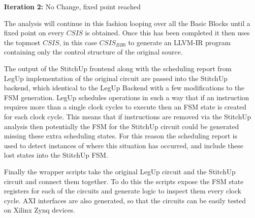 
\vspace{1mm}
\noindent
\textbf{Iteration 2:}\hspace{3mm} No Change, fixed point reached

\vspace{1mm}

The analysis will continue in this fashion looping over all the Basic Blocks until a fixed
point on every $CSIS$ is obtained.
Once this has been completed it then uses the topmost $CSIS$, in this case $CSIS_{BB0}$ to
generate an LLVM-IR program containing only the control structure of the original
source.

The output of the StitchUp frontend along with the scheduling report from LegUp
implementation of the original circuit are passed into the StitchUp backend, which identical
to the LegUp Backend with a few modifications to the FSM generation.
LegUp schedules operations in such a way that if an instruction requires more than a single
clock cycles to execute then an FSM state is created for each clock cycle.
This means that if instructions are removed via the StitchUp analysis then potentially
the FSM for the StitchUp circuit could be generated missing these extra scheduling states.
For this reason the scheduling report is used to detect instances of where this situation has occurred,
and include these lost states into the StitchUp FSM.


Finally the wrapper scripts take the original LegUp circuit and the StitchUp circuit and
connect them together.
To do this the scripts expose the FSM state registers for each of the circuits and
generate logic to inspect them every clock cycle.
AXI interfaces are also generated, so that the circuits can be easily tested on Xilinx Zynq devices.
